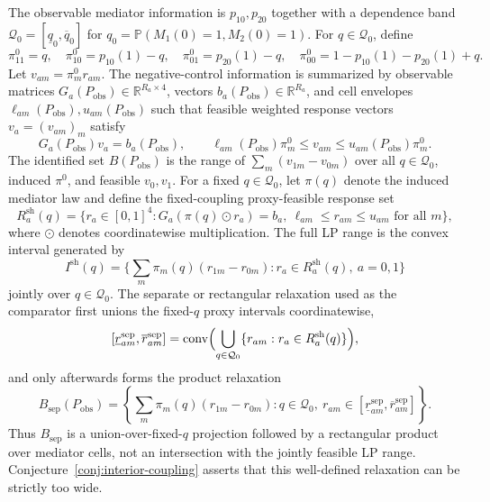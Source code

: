 \documentclass[11pt]{article}
\renewcommand{\Pr}{\mathbb{P}}
\newcommand{\R}{\mathbb{R}}
\theoremstyle{definition}
\theoremstyle{plain}
\theoremstyle{remark}
\begin{document}
The observable mediator information is \(p_{10},p_{20}\) together with a
dependence band \(\mathcal Q_0=[\underline q_0,\overline q_0]\) for
\(q_0=\Pr(M_1(0)=1,M_2(0)=1)\).  For \(q\in\mathcal Q_0\), define
\[
\pi^0_{11}=q,\quad
\pi^0_{10}=p_{10}(1)-q,\quad
\pi^0_{01}=p_{20}(1)-q,\quad
\pi^0_{00}=1-p_{10}(1)-p_{20}(1)+q.
\]
Let \(v_{am}=\pi^0_m r_{am}\).  The negative-control information is summarized
by observable matrices \(G_a(P_{\mathrm{obs}})\in\R^{R_a\times4}\), vectors
\(b_a(P_{\mathrm{obs}})\in\R^{R_a}\),
and cell envelopes \(\ell_{am}(P_{\mathrm{obs}}),u_{am}(P_{\mathrm{obs}})\)
such that feasible weighted response vectors \(v_a=(v_{am})_m\) satisfy
\[
  G_a(P_{\mathrm{obs}})v_a=b_a(P_{\mathrm{obs}}),
  \qquad
  \ell_{am}(P_{\mathrm{obs}})\pi^0_m
  \le v_{am}\le
  u_{am}(P_{\mathrm{obs}})\pi^0_m.
\]
The identified set \(B(P_{\mathrm{obs}})\) is the range of
\(\sum_m(v_{1m}-v_{0m})\) over all \(q\in\mathcal Q_0\), induced
\(\pi^0\), and feasible \(v_0,v_1\).
For a fixed \(q\in\mathcal Q_0\), let \(\pi(q)\) denote the induced mediator
law and define the fixed-coupling proxy-feasible response set
\[
  R_a^{\mathrm{sh}}(q)=
  \{r_a\in[0,1]^4:
      G_a(\pi(q)\odot r_a)=b_a,\ 
      \ell_{am}\le r_{am}\le u_{am}\text{ for all }m\},
\]
where \(\odot\) denotes coordinatewise multiplication.  The full LP range is
the convex interval generated by
\[
  I^{\mathrm{sh}}(q)=
  \{\sum_m\pi_m(q)(r_{1m}-r_{0m}):
      r_a\in R_a^{\mathrm{sh}}(q),\ a=0,1\}
\]
jointly over \(q\in\mathcal Q_0\).  The separate or rectangular relaxation
used as the comparator first unions the fixed-\(q\) proxy intervals
coordinatewise,
\[
  [\underline r^{\mathrm{sep}}_{am},\overline r^{\mathrm{sep}}_{am}]
  =
  \operatorname{conv}\Bigl(
    \bigcup_{q\in\mathcal Q_0}
    \{r_{am}:r_a\in R_a^{\mathrm{sh}}(q)\}
  \Bigr),
\]
and only afterwards forms the product relaxation
\[
  B_{\mathrm{sep}}(P_{\mathrm{obs}})
  =
  \left\{
    \sum_m\pi_m(q)(r_{1m}-r_{0m}):
    q\in\mathcal Q_0,\ 
    r_{am}\in
    [\underline r^{\mathrm{sep}}_{am},\overline r^{\mathrm{sep}}_{am}]
  \right\}.
\]
Thus \(B_{\mathrm{sep}}\) is a union-over-fixed-\(q\) projection followed by a
rectangular product over mediator cells, not an intersection with the jointly
feasible LP range.  Conjecture~\ref{conj:interior-coupling} asserts that this
well-defined relaxation can be strictly too wide.
\end{document}

